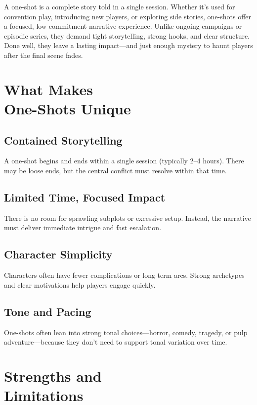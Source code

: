 A one-shot is a complete story told in a single session. Whether it's used for convention play, introducing new players, or exploring side stories, one-shots offer a focused, low-commitment narrative experience. Unlike ongoing campaigns or episodic series, they demand tight storytelling, strong hooks, and clear structure. Done well, they leave a lasting impact—and just enough mystery to haunt players after the final scene fades.

\section[What Makes One-Shots Unique]{What Makes\\ One-Shots Unique}

\subsection*{Contained Storytelling}
A one-shot begins and ends within a single session (typically 2–4 hours). There may be loose ends, but the central conflict must resolve within that time.

\subsection*{Limited Time, Focused Impact}
There is no room for sprawling subplots or excessive setup. Instead, the narrative must deliver immediate intrigue and fast escalation.

\subsection*{Character Simplicity}
Characters often have fewer complications or long-term arcs. Strong archetypes and clear motivations help players engage quickly.

\subsection*{Tone and Pacing}
One-shots often lean into strong tonal choices—horror, comedy, tragedy, or pulp adventure—because they don’t need to support tonal variation over time.

\section[Strengths and Limitations]{Strengths and\\ Limitations}

